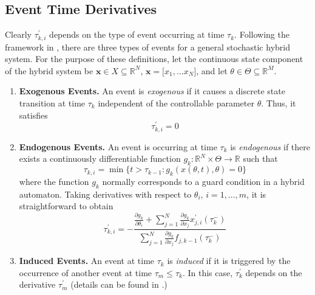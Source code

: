 \documentclass{ifacconf}\usepackage{graphicx}
\begin{document}
\subsection{Event Time Derivatives}

Clearly $\tau_{k,i}^{\prime}$ depends on the type of event occurring at time
$\tau_{k}$. Following the framework in \cite{Cassandras10}, there are three
types of events for a general stochastic hybrid system. For the purpose of
these definitions, let the continuous state component of the hybrid system be
$\mathbf{x}\in X\subseteq\mathbb{R}^{N}$, $\mathbf{x=[}x_{1},\ldots x_{N}]$,
and let $\theta\in\Theta\subseteq\mathbb{R}^{M}$.

\begin{enumerate}
\item \textbf{Exogenous Events.} An event is \emph{exogenous} if it causes a
discrete state transition at time $\tau_{k}$ independent of the controllable
parameter $\theta$. Thus, it satisfies
\begin{equation}
\tau_{k,i}^{\prime}=0
\end{equation}


\item \textbf{Endogenous Events.} An event is occurring at time $\tau_{k}$ is
\emph{endogenous} if there exists a continuously differentiable function
$g_{k}:\mathbb{R}^{N}\times\Theta\rightarrow\mathbb{R}$ such that
\begin{equation}
\tau_{k,i}=\min\{t>\tau_{k-1}:g_{k}(x(\theta,t),\theta)=0\}
\end{equation}
where the function $g_{k}$ normally corresponds to a guard condition in a
hybrid automaton. Taking derivatives with respect to $\theta_{i}$,
$i=1,\ldots,m$, it is straightforward to obtain
\begin{equation}
\tau_{k,i}^{\prime}=-\frac{\frac{\partial g_{k}}{\partial\theta_{i}}+\sum_{j=1}^{N}\frac{\partial g_{k}}{\partial x_{j}}x_{j,i}^{\prime}(\tau
_{k}^{-})}{\sum_{j=1}^{N}\frac{\partial g_{k}}{\partial x_{j}}f_{j,k-1}(\tau_{k}^{-})} \label{dtaudtheta}\end{equation}


\item \textbf{Induced Events.} An event at time $\tau_{k}$ is \emph{induced}
if it is triggered by the occurrence of another event at time $\tau_{m}\leq\tau_{k}$. In this case, $\tau_{k}^{\prime}$ depends on the derivative
$\tau_{m}^{\prime}$ (details can be found in \cite{Cassandras10}.)
\end{enumerate}
\end{document}
